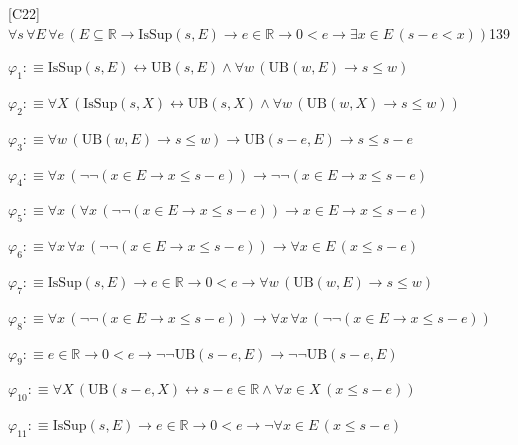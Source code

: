 \begin{fullproof}{[C22]}{$\forall s\,\forall E\,\forall e\,(E \subseteq \mathbb{R} \to \mathrm{IsSup}(s,E) \to e \in \mathbb{R} \to 0 < e \to \exists x \in E\,(s - e < x))$}{139}
\begin{ptree}
\noLine
{}
\end{ptree}
\begin{abbrevlist}
\item $\varphi_{1} :\equiv \mathrm{IsSup}(s,E) \leftrightarrow \mathrm{UB}(s,E) \land \forall w\,(\mathrm{UB}(w,E) \to s \leq w)$
\item $\varphi_{2} :\equiv \forall X\,(\mathrm{IsSup}(s,X) \leftrightarrow \mathrm{UB}(s,X) \land \forall w\,(\mathrm{UB}(w,X) \to s \leq w))$
\item $\varphi_{3} :\equiv \forall w\,(\mathrm{UB}(w,E) \to s \leq w) \to \mathrm{UB}(s - e,E) \to s \leq s - e$
\item $\varphi_{4} :\equiv \forall x\,(\neg \neg (x \in E \to x \leq s - e)) \to \neg \neg (x \in E \to x \leq s - e)$
\item $\varphi_{5} :\equiv \forall x\,(\forall x\,(\neg \neg (x \in E \to x \leq s - e)) \to x \in E \to x \leq s - e)$
\item $\varphi_{6} :\equiv \forall x\,\forall x\,(\neg \neg (x \in E \to x \leq s - e)) \to \forall x \in E\,(x \leq s - e)$
\item $\varphi_{7} :\equiv \mathrm{IsSup}(s,E) \to e \in \mathbb{R} \to 0 < e \to \forall w\,(\mathrm{UB}(w,E) \to s \leq w)$
\item $\varphi_{8} :\equiv \forall x\,(\neg \neg (x \in E \to x \leq s - e)) \to \forall x\,\forall x\,(\neg \neg (x \in E \to x \leq s - e))$
\item $\varphi_{9} :\equiv e \in \mathbb{R} \to 0 < e \to \neg \neg \mathrm{UB}(s - e,E) \to \neg \neg \mathrm{UB}(s - e,E)$
\item $\varphi_{10} :\equiv \forall X\,(\mathrm{UB}(s - e,X) \leftrightarrow s - e \in \mathbb{R} \land \forall x \in X\,(x \leq s - e))$
\item $\varphi_{11} :\equiv \mathrm{IsSup}(s,E) \to e \in \mathbb{R} \to 0 < e \to \neg \forall x \in E\,(x \leq s - e)$

\end{abbrevlist}
\end{fullproof}
